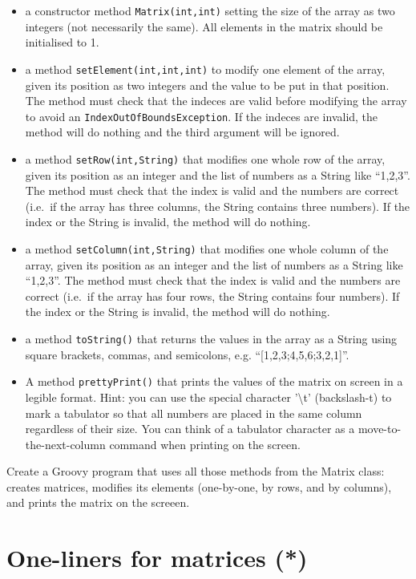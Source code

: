 \documentclass{article}
\begin{document}
\begin{itemize}
\item a constructor method \verb+Matrix(int,int)+ setting the size of
  the array as two 
  integers (not necessarily the same). All elements in the matrix
  should be initialised to 1. 
\item a method \verb+setElement(int,int,int)+ to modify one element
  of the array, given its position 
  as two integers and the value to be put in that position. 
  The method must check that the indeces are valid
  before modifying the array to avoid an
  \verb+IndexOutOfBoundsException+. If the indeces are invalid, the
  method will do nothing and the third argument will be ignored.
\item a method \verb+setRow(int,String)+ that modifies one whole row
  of the array, given its position 
  as an integer and the list of numbers as a String like ``1,2,3''. 
  The method must check that the index is valid and the numbers are
  correct (i.e.~if the array has three columns, the String contains
  three numbers). If the index or the String is invalid, the
  method will do nothing. 
\item a method \verb+setColumn(int,String)+ that modifies one whole 
  column of the array, given its position 
  as an integer and the list of numbers as a String like ``1,2,3''. 
  The method must check that the index is valid and the numbers are
  correct (i.e.~if the array has four rows, the String contains
  four numbers). If the index or the String is invalid, the
  method will do nothing.
\item a method \verb+toString()+ that returns the values in the array
  as a String using square brackets, commas, and semicolons,
  e.g. ``[1,2,3;4,5,6;3,2,1]''. 
\item A method \verb+prettyPrint()+ that prints the values of the
  matrix on screen in a legible format. Hint: you can use the
  special character '\textbackslash t' (backslash-t) 
  to mark a tabulator so that all numbers are
  placed in the same column regardless of their size. You can think of
  a tabulator character as a move-to-the-next-column command when
  printing on the screen. 
\end{itemize}

Create a Groovy program that uses all those methods from the Matrix class:
creates matrices, modifies its elements (one-by-one, by rows, and by
columns), and prints the matrix on the screeen. 

\section{One-liners for matrices (*)}
\label{sec:creat-matr-one}
\end{document}
